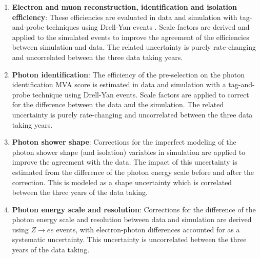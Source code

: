 \begin{enumerate}
  \item \textbf{Electron and muon reconstruction, identification and isolation efficiency}: These efficiencies are evaluated in data and simulation with tag-and-probe techniques using Drell-Yan events \cite{Khachatryan:2015hwa, Sirunyan:2018fpa}. Scale factors are derived and applied to the simulated events to improve the agreement of the efficiencies between simulation and data. The related uncertainty is purely rate-changing and uncorrelated between the three data taking years.

  \item \textbf{Photon identification}: The efficiency of the pre-selection on the photon identification MVA score is estimated in data and simulation with a tag-and-probe technique using Drell-Yan events. Scale factors are applied to correct for the difference between the data and the simulation. The related uncertainty is purely rate-changing  and uncorrelated between the three data taking years.        


  \item \textbf{Photon shower shape}: Corrections for the imperfect modeling of the photon shower shape (and isolation) variables in simulation are applied to improve the agreement with the data. The impact of this uncertainty is estimated from the difference of the photon energy scale before and after the correction. This is modeled as a shape uncertainty which is correlated between the three years of the data taking.

  \item \textbf{Photon energy scale and resolution}: Corrections for the difference of the photon energy scale and resolution between data and simulation are derived using $Z \rightarrow ee$ events, with electron-photon differences accounted for as a systematic uncertainty. This uncertainty is uncorrelated between the three years of the data taking.



\end{enumerate}
